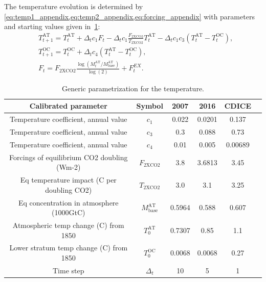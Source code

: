 \documentclass[11pt, a4paper, pdftex, twoside, dvipsnames]{article}
\begin{document}
\begin{appendices}
The temperature evolution is determined by \cref{eq:temp1_appendix,eq:temp2_appendix,eq:forcing_appendix} with parameters and starting values given in~\cref{table:temps}:
\begin{align}
& \label{eq:temp1_appendix} T^{\text{AT}}_{t+1} = T^{\text{AT}}_{t} + \Delta_tc_1 F_t  - \Delta_tc_1 \frac{F_{\text{2XCO2}}}{T_{\text{2XCO2}}}T^{\text{AT}}_{t}- \Delta_tc_1c_3 \left(T^{\text{AT}}_{t}-T^{\text{OC}}_{t}\right),    \\
   & \label{eq:temp2_appendix}  T^{\text{OC}}_{t+1} = T^{\text{OC}}_{t} + \Delta_tc_4 \left(T^{\text{AT}}_{t}  - T^{\text{OC}}_{t}\right),\\
   & \label{eq:forcing_appendix} F_{t} = F_{\text{2XCO2}} \frac{\log(M^{\text{AT}}_{t}/M^{\text{AT}}_{\text{base}})}{\log(2)} + F^{EX}_{t}.
\end{align}

\begin{table}[H]
\centering
\begin{tabular}{ c c c c c c } 
 \toprule
 Calibrated parameter & Symbol  & 2007 & 2016 & CDICE \\ 
 \midrule
 Temperature coefficient, annual value & $c_{1}$  & 0.022 & 0.0201 & 0.137\\
 Temperature coefficient, annual value & $c_{3}$  & 0.3 & 0.088 & 0.73\\
 Temperature coefficient, annual value & $c_{4}$  & 0.01 & 0.005 & 0.00689\\ 
 Forcings of equilibrium CO2 doubling (Wm-2) & $F_{\text{2XCO2}}$  & 3.8 & 3.6813 & 3.45\\
 Eq temperature impact (\textdegree{}C per doubling CO2) & $T_\text{2XCO2}$  & 3.0 & 3.1 & 3.25\\
 Eq concentration in atmosphere (1000GtC) & $M^{\text{AT}}_{\text{base}}$  & 0.5964 & 0.588 & 0.607\\
 Atmospheric temp change (\textdegree{}C) from 1850  & $T^{\text{AT}}_0$  & 0.7307 & 0.85 & 1.1\\
 Lower stratum temp change (\textdegree{}C) from 1850  & $T^{\text{OC}}_0$  & 0.0068 & 0.0068 & 0.27\\
 Time step & $\Delta_t$  & 10 & 5 & 1\\
 \bottomrule
\end{tabular}
\caption{Generic parametrization for the temperature.}
\label{table:temps}
\end{table}


\end{appendices}
\end{document}
